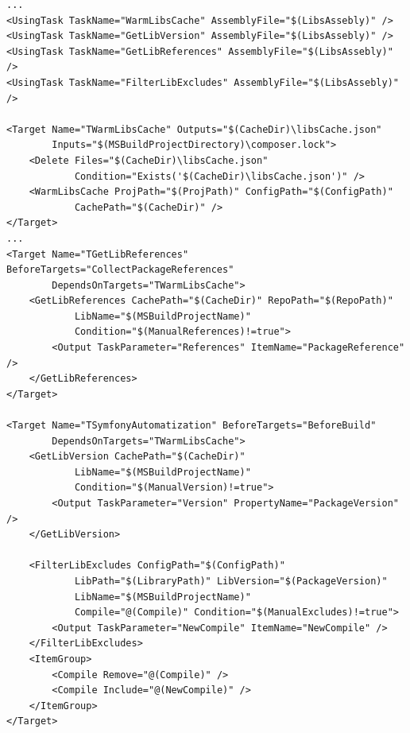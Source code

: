 \begin{center}
\begin{lstlisting}[caption={automatizationConfig.targets},captionpos=b]
...
<UsingTask TaskName="WarmLibsCache" AssemblyFile="$(LibsAssebly)" />
<UsingTask TaskName="GetLibVersion" AssemblyFile="$(LibsAssebly)" />
<UsingTask TaskName="GetLibReferences" AssemblyFile="$(LibsAssebly)" />
<UsingTask TaskName="FilterLibExcludes" AssemblyFile="$(LibsAssebly)" />
	
<Target Name="TWarmLibsCache" Outputs="$(CacheDir)\libsCache.json"
		Inputs="$(MSBuildProjectDirectory)\composer.lock">
	<Delete Files="$(CacheDir)\libsCache.json" 
			Condition="Exists('$(CacheDir)\libsCache.json')" />
	<WarmLibsCache ProjPath="$(ProjPath)" ConfigPath="$(ConfigPath)"
			CachePath="$(CacheDir)" />
</Target>
...
<Target Name="TGetLibReferences" BeforeTargets="CollectPackageReferences"
		DependsOnTargets="TWarmLibsCache">
	<GetLibReferences CachePath="$(CacheDir)" RepoPath="$(RepoPath)" 
			LibName="$(MSBuildProjectName)" 
			Condition="$(ManualReferences)!=true">
		<Output TaskParameter="References" ItemName="PackageReference" />
	</GetLibReferences>
</Target>
	
<Target Name="TSymfonyAutomatization" BeforeTargets="BeforeBuild" 	 	 
		DependsOnTargets="TWarmLibsCache">
	<GetLibVersion CachePath="$(CacheDir)" 
			LibName="$(MSBuildProjectName)" 
			Condition="$(ManualVersion)!=true">
		<Output TaskParameter="Version" PropertyName="PackageVersion" />
	</GetLibVersion>

	<FilterLibExcludes ConfigPath="$(ConfigPath)" 
			LibPath="$(LibraryPath)" LibVersion="$(PackageVersion)" 
			LibName="$(MSBuildProjectName)" 
			Compile="@(Compile)" Condition="$(ManualExcludes)!=true">
		<Output TaskParameter="NewCompile" ItemName="NewCompile" />
	</FilterLibExcludes>
	<ItemGroup>
		<Compile Remove="@(Compile)" />
		<Compile Include="@(NewCompile)" />
	</ItemGroup>
</Target>
\end{lstlisting}
\end{center}

